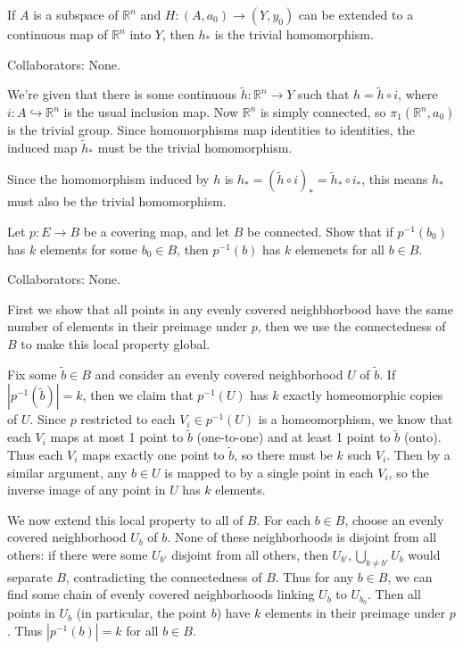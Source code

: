 \documentclass[10pt]{report}
\begin{document}
\pagebreak
\begin{exer}[\S 52 pg. 335 \#5]
	If $A$ is a subspace of $\mathbb{R}^n$ and $H:(A,a_0)\to (Y,y_0)$ can be extended to a continuous map of $\mathbb{R}^n$ into $Y$, then $h_{*}$ is the trivial homomorphism.
\end{exer}
{\color{blue}Collaborators: None.}

We're given that there is some continuous $\tilde{h}:\mathbb{R}^n\to Y$ such that $h=\tilde{h} \circ i$, where $i: A \hookrightarrow \mathbb{R}^{n}$ is the usual inclusion map. Now $\mathbb{R}^n$ is simply connected, so $\pi_1(\mathbb{R}^n,a_0)$ is the trivial group. Since homomorphisms map identities to identities, the induced map $\tilde{h}_{*}$ must be the trivial homomorphism.

Since the homomorphism induced by $h$ is $h_{*} = (\tilde{h} \circ i)_{*}= \tilde{h}_{*}\circ i_{*}$, this means $h_{*}$ must also be the trivial homomorphism.

\pagebreak
\begin{exer}[\S 53 pg. 341 \#3]
	Let $p:E\to B$ be a covering map, and let $B$ be connected. Show that if $p^{-1}(b_0)$ has $k$ elements for some $b_0 \in B$, then $p^{-1}(b)$ has $k$ elemenets for all $b \in B$.
\end{exer}
{\color{blue}Collaborators: None.}

First we show that all points in any evenly covered neighbhorbood have the same number of elements in their preimage under $p$, then we use the connectedness of $B$ to make this local property global.

Fix some $\tilde{b} \in B$ and consider an evenly covered neighborhood $U$ of $\tilde{b}$. If $|p^{-1}(\tilde{b})|=k$, then we claim that $p^{-1}(U)$ has $k$ exactly homeomorphic copies of $U$. Since $p$ restricted to each $V_i \in p^{-1}(U)$ is a homeomorphism, we know that each $V_i$ maps at most 1 point to $\tilde{b}$ (one-to-one) and at least 1 point to $\tilde{b}$ (onto). Thus each $V_i$ maps exactly one point to $\tilde{b}$, so there must be $k$ such $V_i$. Then by a similar argument, any $b \in U$ is mapped to by a single point in each $V_i$, so the inverse image of any point in $U$ has $k$ elements.

We now extend this local property to all of $B$. For each $b \in B$, choose an evenly covered neighborhood $U_{b}$ of $b$. None of these neighborhoods is disjoint from all others: if there were some $U_{b'}$ disjoint from all others, then $U_{b'}, \bigcup_{b \neq b'} U_{b}$ would separate $B$, contradicting the connectedness of $B$. Thus for any $b \in B$, we can find some chain of evenly covered neighborhoods linking $U_{b}$ to $U_{b_0}$. Then all points in $U_{b}$ (in particular, the point $b$) have $k$ elements in their preimage under $p$. Thus $|p^{-1}(b)|=k$ for all $b \in B$.
\end{document}
